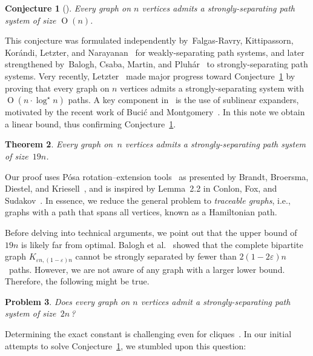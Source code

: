 \documentclass[11pt]{article}
\newcommand{\defi}[1]{\emph{#1}}
\DeclareMathOperator{\bigoh}{\mathrm{O}}
\newtheorem{theorem}{Theorem}
\newtheorem{problem}[theorem]{Problem}
\newtheorem{conjecture}[theorem]{Conjecture}
\begin{document}
\begin{conjecture}[\cite{balogh2016path,falgas2013separating}]\label{conj:lin-sep}
Every graph on $n$ vertices admits a strongly-separating path system of size $\bigoh(n)$.
\end{conjecture}



This conjecture was formulated independently by~Falgas-Ravry, Kittipassorn, Kor\'andi, Letzter, and Narayanan~\cite{falgas2013separating} for weakly-separating path systems,
and later strengthened by~Balogh, Csaba, Martin, and Pluh\'ar~\cite{balogh2016path} to strongly-separating path systems.
Very recently, Letzter~\cite{letzter2022separating} made
major progress toward Conjecture~\ref{conj:lin-sep} by proving
that every graph on \(n\) vertices admits a strongly-separating
system with $\bigoh(n\cdot \log^\star n)$ paths. A key component
in~\cite{letzter2022separating} is the use of sublinear
expanders, motivated by the recent work of Buci\'c and
Montgomery~\cite{bucic2022towards}.
 In this note we obtain a linear bound, thus confirming Conjecture~\ref{conj:lin-sep}.

\begin{theorem}\label{thm:main}
  Every graph on~$n$ vertices	admits a strongly-separating path system of size~\(19n\).
\end{theorem}


Our proof uses Pósa rotation--extension tools~\cite{posa1976hamiltonian}
as presented by Brandt, Broersma, Diestel, and Kriesell~\cite{brandt2006global},
and is inspired by  Lemma~2.2 in Conlon, Fox, and Sudakov~\cite{conlon2014cycle}.
In essence, we reduce the general problem to
\defi{traceable graphs}, i.e., graphs with a path that spans all vertices, known as a Hamiltonian path.

Before delving into technical arguments, we point out that the upper bound of $19n$ is likely far from optimal.
Balogh et al.~\cite[Theorem 10]{balogh2016path} showed that the complete bipartite graph \(K_{\varepsilon n,(1-\varepsilon)n}\)
cannot be strongly separated by fewer than \(2(1-2\varepsilon)n\)~paths.
However, we are not aware of any graph with a larger lower bound. Therefore, the following might be true.
\begin{problem}
  Does every graph on $n$ vertices admit a strongly-separating path system of size~$2n$\,?
\end{problem}
Determining the exact constant is challenging even for cliques~\cite{wickes}.
In our initial attempts to solve Conjecture~\ref{conj:lin-sep}, we stumbled upon this question:
\end{document}
